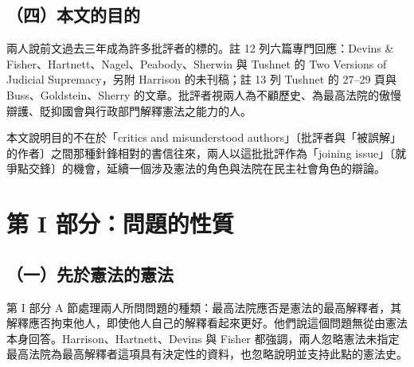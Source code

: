 \subsection{（四）本文的目的}

兩人說前文過去三年成為許多批評者的標的。註 12 列六篇專門回應：Devins \& Fisher、Hartnett、Nagel、Peabody、Sherwin 與 Tushnet 的 Two Versions of Judicial Supremacy，另附 Harrison 的未刊稿；註 13 列 Tushnet 的  27--29 頁與 Buss、Goldstein、Sherry 的文章。批評者視兩人為不顧歷史、為最高法院的傲慢辯護、貶抑國會與行政部門解釋憲法之能力的人。

本文說明目的不在於「critics and \textquotesingle misunderstood\textquotesingle{} authors」〔批評者與「被誤解」的作者〕之間那種針鋒相對的書信往來，兩人以這批批評作為「joining issue」〔就爭點交鋒〕的機會，延續一個涉及憲法的角色與法院在民主社會角色的辯論。

\section{第 I 部分：問題的性質}
\label{sec:AS-2}

\subsection{（一）先於憲法的憲法}

第 I 部分 A 節處理兩人所問問題的種類：最高法院應否是憲法的最高解釋者，其解釋應否拘束他人，即使他人自己的解釋看起來更好。他們說這個問題無從由憲法本身回答。Harrison、Hartnett、Devins 與 Fisher 都強調，兩人忽略憲法未指定最高法院為最高解釋者這項具有決定性的資料，也忽略說明並支持此點的憲法史。

